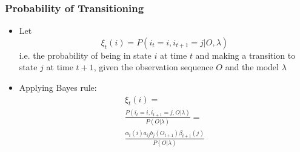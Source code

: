 \documentclass{beamer}
\begin{document}
\begin{frame}
    \frametitle{Probability of Transitioning}
    \begin{itemize}
    \item Let
        \begin{displaymath}
            \xi_t(i) = P(i_t = i, i_{t+1} = j|O,\lambda)
        \end{displaymath}
        i.e. the probability of being in state $i$ at time $t$ and making a
        transition to state $j$ at time $t + 1$, given the observation sequence
        $O$ and the model $\lambda$
    \item Applying Bayes rule:
        \begin{multline*}
            \xi_t(i) = \\
            \frac{P(i_t = i, i_{t+1} = j,O|\lambda)}{P(O|\lambda)} = \\
            \frac{\alpha_t(i)a_{ij}b_j(O_{t+1})\beta_{t+1}(j)}{P(O|\lambda)}
        \end{multline*}
    \end{itemize}
\end{frame}

\end{document}
